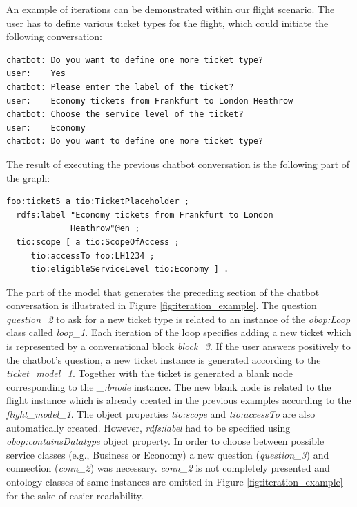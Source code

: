 \documentclass[runningheads]{llncs}
\begin{document}
An example of iterations can be demonstrated within our flight scenario. The user has to define various ticket types for the flight, which could initiate the following conversation:
\begin{lstlisting}[basicstyle=\small,  xleftmargin=0.7cm ]
chatbot: Do you want to define one more ticket type?
user:    Yes
chatbot: Please enter the label of the ticket?
user:    Economy tickets from Frankfurt to London Heathrow
chatbot: Choose the service level of the ticket?
user:    Economy
chatbot: Do you want to define one more ticket type?
\end{lstlisting}
The result of executing the previous chatbot conversation is the following part of the graph:
\begin{lstlisting}[basicstyle=\small,  xleftmargin=0.7cm ]
foo:ticket5 a tio:TicketPlaceholder ;
  rdfs:label "Economy tickets from Frankfurt to London
             Heathrow"@en ;
  tio:scope [ a tio:ScopeOfAccess ;
     tio:accessTo foo:LH1234 ;
     tio:eligibleServiceLevel tio:Economy ] .
\end{lstlisting}
The part of the model that generates the preceding section of the chatbot conversation is illustrated in Figure \ref{fig:iteration_example}. The question \textit{question\_2} to ask for a new ticket type is related to an instance of the \textit{obop:Loop} class called \textit{loop\_1}. Each iteration of the loop specifies adding a new ticket which is represented by a conversational block \textit{block\_3}. If the user answers positively to the chatbot's question, a new ticket instance is generated according to the \textit{ticket\_model\_1}. Together with the ticket is generated a blank node corresponding to the \textit{\_:bnode} instance. The new blank node is related to the flight instance which is already created in the previous examples according to the \textit{flight\_model\_1}. The object properties \textit{tio:scope} and \textit{tio:accessTo} are also automatically created. However, \textit{rdfs:label} had to be specified using \textit{obop:containsDatatype} object property. In order to choose between possible service classes (e.g., Business or Economy) a new question (\textit{question\_3}) and connection (\textit{conn\_2}) was necessary. \textit{conn\_2} is not completely presented and ontology classes of same instances are omitted in Figure \ref{fig:iteration_example} for the sake of easier readability.
\end{document}
